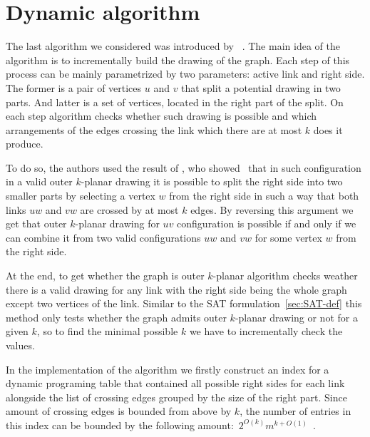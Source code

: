 
\section{Dynamic algorithm}

The last algorithm we considered was introduced by \citeauthor{okp}~\cite{okp}. The main idea of the algorithm is to incrementally build the drawing of the graph. Each step of this process can be mainly parametrized by two parameters: active link and right side. The former is a pair of vertices \(u\) and \(v\) that split a potential drawing in two parts. And latter is a set of vertices, located in the right part of the split. On each step algorithm checks whether such drawing is possible and which arrangements of the edges crossing the link which there are at most \(k\) does it produce.

To do so, the authors used the result of \citeauthor{triangulations}, who showed~\cite{triangulations} that in such configuration in a valid outer \(k\)-planar drawing it is possible to split the right side into two smaller parts by selecting a vertex \(w\) from the right side in such a way that both links \(uw\) and \(vw\) are crossed by at most \(k\) edges. By reversing this argument we get that outer \(k\)-planar drawing for \(uv\) configuration is possible if and only if we can combine it from two valid configurations \(uw\) and \(vw\) for some vertex \(w\) from the right side.

At the end, to get whether the graph is outer \(k\)-planar algorithm checks weather there is a valid drawing for any link with the right side being the whole graph except two vertices of the link. Similar to the SAT formulation~\ref{sec:SAT-def} this method only tests whether the graph admits outer \(k\)-planar drawing or not for a given \(k\), so to find the minimal possible \(k\) we have to incrementally check the values.

In the implementation of the algorithm we firstly construct an index for a dynamic programing table that contained all possible right sides for each link alongside the list of crossing edges grouped by the size of the right part. Since amount of crossing edges is bounded from above by \(k\), the number of entries in this index can be bounded by the following amount:~\(2^{O(k)}m^{k+O(1)}\)~\cite[Lemma 15]{okp}.

